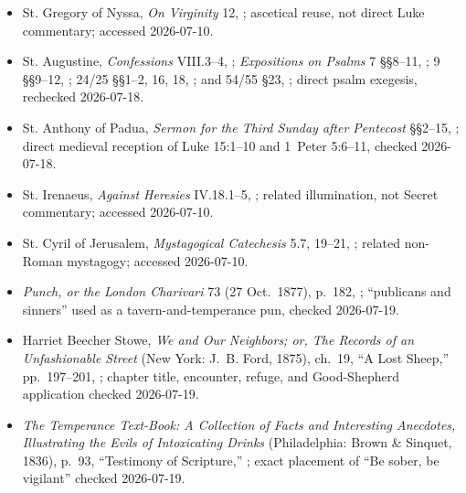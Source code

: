 \begin{deepstudy}
{\begin{itemize}[itemsep=0em,topsep=0.15em,parsep=0pt]
\item St. Gregory of Nyssa, \emph{On Virginity} 12, ; ascetical reuse, not direct Luke commentary; accessed 2026-07-10.
\item St. Augustine, \emph{Confessions} VIII.3--4, ; \emph{Expositions on Psalms} 7 §§8--11, ; 9 §§9--12, ; 24/25 §§1--2, 16, 18, ; and 54/55 §23, ; direct psalm exegesis, rechecked 2026-07-18.
\item St. Anthony of Padua, \emph{Sermon for the Third Sunday after Pentecost} §§2--15, ; direct medieval reception of Luke 15:1--10 and 1~Peter 5:6--11, checked 2026-07-18.
\item St. Irenaeus, \emph{Against Heresies} IV.18.1--5, ; related illumination, not Secret commentary; accessed 2026-07-10.
\item St. Cyril of Jerusalem, \emph{Mystagogical Catechesis} 5.7, 19--21, ; related non-Roman mystagogy; accessed 2026-07-10.
\item \emph{Punch, or the London Charivari} 73 (27 Oct.~1877), p.~182, ; ``publicans and sinners'' used as a tavern-and-temperance pun, checked 2026-07-19.
\item Harriet Beecher Stowe, \emph{We and Our Neighbors; or, The Records of an Unfashionable Street} (New York: J.~B. Ford, 1875), ch.~19, ``A Lost Sheep,'' pp.~197--201, ; chapter title, encounter, refuge, and Good-Shepherd application checked 2026-07-19.
\item \emph{The Temperance Text-Book: A Collection of Facts and Interesting Anecdotes, Illustrating the Evils of Intoxicating Drinks} (Philadelphia: Brown \& Sinquet, 1836), p.~93, ``Testimony of Scripture,'' ; exact placement of ``Be sober, be vigilant'' checked 2026-07-19.
\end{itemize}
}


\end{deepstudy}

